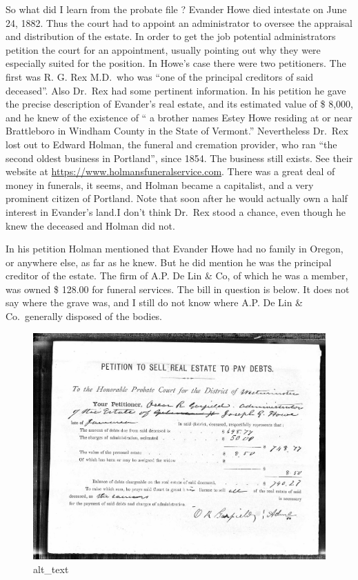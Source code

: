 \documentclass[
  12pt,
]{book}
\begin{document}
So what did I learn from the probate file ? Evander Howe died intestate on June 24, 1882. Thus the court had to appoint an administrator to oversee the appraisal and distribution of the estate. In order to get the job potential administrators petition the court for an appointment, usually pointing out why they were especially suited for the position. In Howe's case there were two petitioners. The first was R. G. Rex M.D.~who was ``one of the principal creditors of said deceased''. Also Dr.~Rex had some pertinent information. In his petition he gave the precise description of Evander's real estate, and its estimated value of \$ 8,000, and he knew of the existence of `` a brother names Estey Howe residing at or near Brattleboro in Windham County in the State of Vermont.'' Nevertheless Dr.~Rex lost out to Edward Holman, the funeral and cremation provider, who ran ``the second oldest business in Portland'', since 1854. The business still exists. See their website at \url{https://www.holmansfuneralservice.com}. There was a great deal of money in funerals, it seems, and Holman became a capitalist, and a very prominent citizen of Portland. Note that soon after he would actually own a half interest in Evander's land.I don't think Dr.~Rex stood a chance, even though he knew the deceased and Holman did not.

In his petition Holman mentioned that Evander Howe had no family in Oregon, or anywhere else, as far as he knew. But he did mention he was the principal creditor of the estate. The firm of A.P. De Lin \& Co, of which he was a member, was owned \$ 128.00 for funeral services. The bill in question is below. It does not say where the grave was, and I still do not know where A.P. De Lin \& Co.~generally disposed of the bodies.

\begin{figure}
\centering
\includegraphics{images/0201b_images/image1.jpg}
\caption{alt\_text}
\end{figure}
\end{document}
